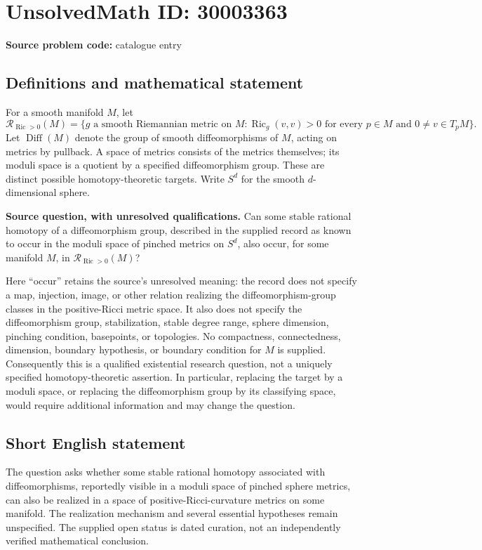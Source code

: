 \documentclass[11pt]{article}
\begin{document}
\section*{UnsolvedMath ID: 30003363}
\textbf{Source problem code:} catalogue entry
\subsection{Definitions and mathematical statement}
For a smooth manifold \(M\), let
\[
\mathcal R_{\operatorname{Ric}>0}(M)=\{g\text{ a smooth Riemannian metric on }M:\operatorname{Ric}_g(v,v)>0\text{ for every }p\in M\text{ and }0\ne v\in T_pM\}.
\]
Let \(\operatorname{Diff}(M)\) denote the group of smooth diffeomorphisms of \(M\), acting on metrics by pullback. A space of metrics consists of the metrics themselves; its moduli space is a quotient by a specified diffeomorphism group. These are distinct possible homotopy-theoretic targets. Write \(S^d\) for the smooth \(d\)-dimensional sphere.

\textbf{Source question, with unresolved qualifications.} Can some stable rational homotopy of a diffeomorphism group, described in the supplied record as known to occur in the moduli space of pinched metrics on \(S^d\), also occur, for some manifold \(M\), in \(\mathcal R_{\operatorname{Ric}>0}(M)\)?

Here ``occur'' retains the source's unresolved meaning: the record does not specify a map, injection, image, or other relation realizing the diffeomorphism-group classes in the positive-Ricci metric space. It also does not specify the diffeomorphism group, stabilization, stable degree range, sphere dimension, pinching condition, basepoints, or topologies. No compactness, connectedness, dimension, boundary hypothesis, or boundary condition for \(M\) is supplied. Consequently this is a qualified existential research question, not a uniquely specified homotopy-theoretic assertion. In particular, replacing the target by a moduli space, or replacing the diffeomorphism group by its classifying space, would require additional information and may change the question.
\subsection{Short English statement}
The question asks whether some stable rational homotopy associated with diffeomorphisms, reportedly visible in a moduli space of pinched sphere metrics, can also be realized in a space of positive-Ricci-curvature metrics on some manifold. The realization mechanism and several essential hypotheses remain unspecified. The supplied open status is dated curation, not an independently verified mathematical conclusion.
\end{document}
